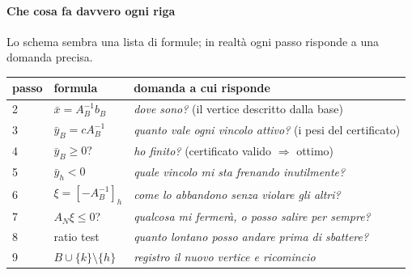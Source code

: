 \documentclass[12pt]{extarticle} %
\begin{document}
\paragraph{Che cosa fa davvero ogni riga}
Lo schema sembra una lista di formule; in realtà ogni passo risponde a una domanda precisa.
\begin{center}
\begin{tabular}{lll}
\hline
\textbf{passo} & \textbf{formula} & \textbf{domanda a cui risponde} \\
\hline
2 & $\bar{x} = A_B^{-1}b_B$ & \emph{dove sono?} (il vertice descritto dalla base) \\
3 & $\bar{y}_B = cA_B^{-1}$ & \emph{quanto vale ogni vincolo attivo?} (i pesi del certificato) \\
4 & $\bar{y}_B \ge 0$? & \emph{ho finito?} (certificato valido $\Rightarrow$ ottimo) \\
5 & $\bar{y}_h < 0$ & \emph{quale vincolo mi sta frenando inutilmente?} \\
6 & $\xi = [-A_B^{-1}]_h$ & \emph{come lo abbandono senza violare gli altri?} \\
7 & $A_N\xi \le 0$? & \emph{qualcosa mi fermerà, o posso salire per sempre?} \\
8 & ratio test & \emph{quanto lontano posso andare prima di sbattere?} \\
9 & $B \cup \{k\}\setminus\{h\}$ & \emph{registro il nuovo vertice e ricomincio} \\
\hline
\end{tabular}
\end{center}
\end{document}
